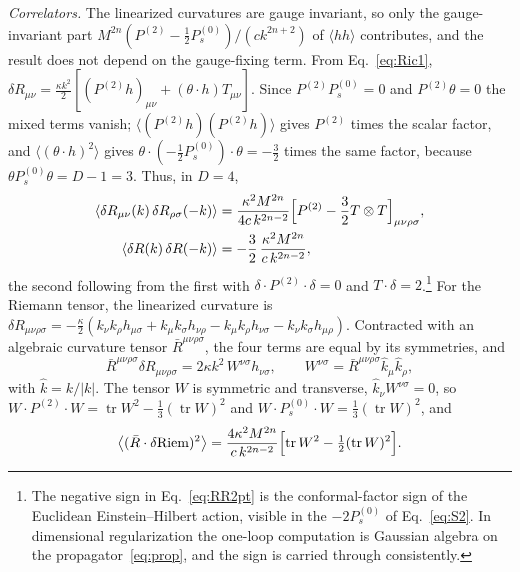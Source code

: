 \documentclass[aps,prd,10pt,twocolumn,superscriptaddress,nofootinbib,floatfix,longbibliography]{revtex4-2}
\newcommand{\Pt}{P^{(2)}}
\newcommand{\Ps}{P^{(0)}_{s}}
\newcommand{\Riem}{\mathrm{Riem}}
\begin{document}
\textit{Correlators.} The linearized curvatures are gauge invariant, so only the gauge-invariant part $M^{2n}(\Pt-\frac12\Ps)/(ck^{2n+2})$ of $\langle hh\rangle$ contributes, and the result does not depend on the gauge-fixing term. From Eq.~\eqref{eq:Ric1}, $\delta R_{\mu\nu}=\frac{\kappa k^2}2[(\Pt h)_{\mu\nu}+(\theta\cdot h)T_{\mu\nu}]$. Since $\Pt\Ps=0$ and $\Pt\theta=0$ the mixed terms vanish; $\langle(\Pt h)(\Pt h)\rangle$ gives $\Pt$ times the scalar factor, and $\langle(\theta\cdot h)^2\rangle$ gives $\theta\cdot(-\frac12\Ps)\cdot\theta=-\frac32$ times the same factor, because $\theta\Ps\theta=D-1=3$. Thus, in $D=4$,
\begin{align}
\langle\delta R_{\mu\nu}(k)\,\delta R_{\rho\sigma}(-k)\rangle&=\frac{\kappa^2M^{2n}}{4c\,k^{2n-2}}\Bigl[\Pt-\frac32T\otimes T\Bigr]_{\mu\nu\rho\sigma},\label{eq:RicRic2pt}\\
\langle\delta R(k)\,\delta R(-k)\rangle&=-\frac32\,\frac{\kappa^2M^{2n}}{c\,k^{2n-2}},\label{eq:RR2pt}
\end{align}
the second following from the first with $\delta\cdot\Pt\cdot\delta=0$ and $T\cdot\delta=2$.\footnote{The negative sign in Eq.~\eqref{eq:RR2pt} is the conformal-factor sign of the Euclidean Einstein--Hilbert action, visible in the $-2\Ps$ of Eq.~\eqref{eq:S2}. In dimensional regularization the one-loop computation is Gaussian algebra on the propagator~\eqref{eq:prop}, and the sign is carried through consistently.} For the Riemann tensor, the linearized curvature is $\delta R_{\mu\nu\rho\sigma}=-\frac\kappa2(k_\nu k_\rho h_{\mu\sigma}+k_\mu k_\sigma h_{\nu\rho}-k_\mu k_\rho h_{\nu\sigma}-k_\nu k_\sigma h_{\mu\rho})$. Contracted with an algebraic curvature tensor $\bar R^{\mu\nu\rho\sigma}$, the four terms are equal by its symmetries, and
\begin{equation}
\label{eq:RiemW}
\bar R^{\mu\nu\rho\sigma}\delta R_{\mu\nu\rho\sigma}=2\kappa k^2\,W^{\nu\sigma}h_{\nu\sigma},\qquad W^{\nu\sigma}=\bar R^{\mu\nu\rho\sigma}\hat k_\mu\hat k_\rho ,
\end{equation}
with $\hat k=k/|k|$. The tensor $W$ is symmetric and transverse, $\hat k_\nu W^{\nu\sigma}=0$, so $W\cdot\Pt\cdot W=\operatorname{tr}W^2-\frac13(\operatorname{tr}W)^2$ and $W\cdot\Ps\cdot W=\frac13(\operatorname{tr}W)^2$, and
\begin{equation}
\label{eq:RiemRiem2pt}
\bigl\langle(\bar R\cdot\delta\Riem)^2\bigr\rangle=\frac{4\kappa^2M^{2n}}{c\,k^{2n-2}}\Bigl[\operatorname{tr}W^2-\tfrac12(\operatorname{tr}W)^2\Bigr].
\end{equation}
\end{document}
